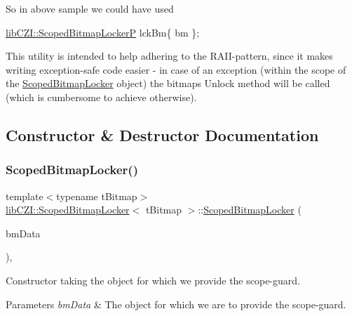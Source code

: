 So in above sample we could have used 
\begin{DoxyCode}
\hyperlink{classlib_c_z_i_1_1_scoped_bitmap_locker}{libCZI::ScopedBitmapLockerP} lckBm\{ bm \};
\end{DoxyCode}


This utility is intended to help adhering to the R\+A\+I\+I-\/pattern, since it makes writing exception-\/safe code easier -\/ in case of an exception (within the scope of the \hyperlink{classlib_c_z_i_1_1_scoped_bitmap_locker}{Scoped\+Bitmap\+Locker} object) the bitmap\textquotesingle{}s Unlock method will be called (which is cumbersome to achieve otherwise). 

\subsection{Constructor \& Destructor Documentation}
\mbox{\label{classlib_c_z_i_1_1_scoped_bitmap_locker_a871926718a1b6f2b00002d327154049b}} 
\subsubsection{\texorpdfstring{Scoped\+Bitmap\+Locker()}{ScopedBitmapLocker()}\hspace{0.1cm}{\footnotesize\ttfamily [1/2]}}
{\footnotesize\ttfamily template$<$typename t\+Bitmap$>$ \\
\hyperlink{classlib_c_z_i_1_1_scoped_bitmap_locker}{lib\+C\+Z\+I\+::\+Scoped\+Bitmap\+Locker}$<$ t\+Bitmap $>$\+::\hyperlink{classlib_c_z_i_1_1_scoped_bitmap_locker}{Scoped\+Bitmap\+Locker} (\begin{DoxyParamCaption}\item[{t\+Bitmap}]{bm\+Data }\end{DoxyParamCaption})\hspace{0.3cm}{\ttfamily [inline]}, {\ttfamily [explicit]}}

Constructor taking the object for which we provide the scope-\/guard. 
\begin{DoxyParams}{Parameters}
{\em bm\+Data} & The object for which we are to provide the scope-\/guard. \\
\hline
\end{DoxyParams}
\mbox{\label{classlib_c_z_i_1_1_scoped_bitmap_locker_a3d5e197884453daaa5c6252a6dd19e9e}} 
